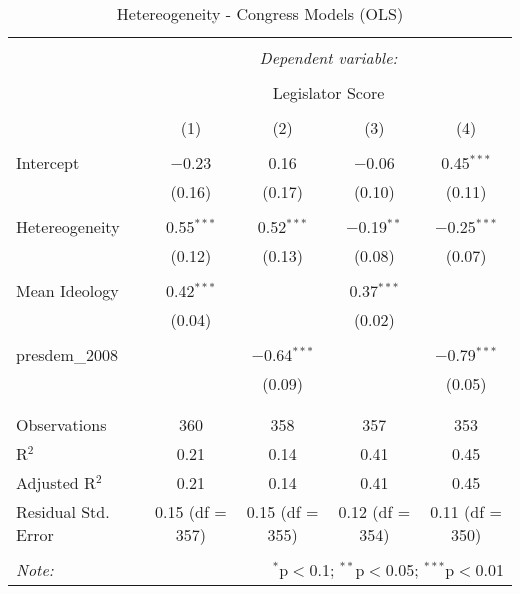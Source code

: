 
\begin{table}[!htbp] \centering 
  \caption{Hetereogeneity - Congress Models (OLS)} 
  \label{models} 
\footnotesize 
\begin{tabular}{@{\extracolsep{5pt}}lcccc} 
\\[-1.8ex]\hline 
\hline \\[-1.8ex] 
 & \multicolumn{4}{c}{\textit{Dependent variable:}} \\ 
\cline{2-5} 
\\[-1.8ex] & \multicolumn{4}{c}{Legislator Score} \\ 
\\[-1.8ex] & (1) & (2) & (3) & (4)\\ 
\hline \\[-1.8ex] 
 Intercept & $-$0.23 & 0.16 & $-$0.06 & 0.45$^{***}$ \\ 
  & (0.16) & (0.17) & (0.10) & (0.11) \\ 
  & & & & \\ 
 Hetereogeneity & 0.55$^{***}$ & 0.52$^{***}$ & $-$0.19$^{**}$ & $-$0.25$^{***}$ \\ 
  & (0.12) & (0.13) & (0.08) & (0.07) \\ 
  & & & & \\ 
 Mean Ideology & 0.42$^{***}$ &  & 0.37$^{***}$ &  \\ 
  & (0.04) &  & (0.02) &  \\ 
  & & & & \\ 
 presdem\_2008 &  & $-$0.64$^{***}$ &  & $-$0.79$^{***}$ \\ 
  &  & (0.09) &  & (0.05) \\ 
  & & & & \\ 
\hline \\[-1.8ex] 
Observations & 360 & 358 & 357 & 353 \\ 
R$^{2}$ & 0.21 & 0.14 & 0.41 & 0.45 \\ 
Adjusted R$^{2}$ & 0.21 & 0.14 & 0.41 & 0.45 \\ 
Residual Std. Error & 0.15 (df = 357) & 0.15 (df = 355) & 0.12 (df = 354) & 0.11 (df = 350) \\ 
\hline 
\hline \\[-1.8ex] 
\textit{Note:}  & \multicolumn{4}{r}{$^{*}$p$<$0.1; $^{**}$p$<$0.05; $^{***}$p$<$0.01} \\ 
\end{tabular} 
\end{table} 
